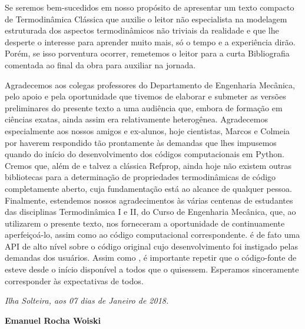     Se seremos bem-sucedidos em nosso propósito de apresentar um texto compacto
    de Termodinâmica Clássica que auxilie o leitor não especialista na
    modelagem estruturada dos aspectos termodinâmicos não triviais da realidade
    e que lhe desperte o interesse para aprender muito mais, só o tempo e a
    experiência dirão. Porém, se isso porventura ocorrer, remetemos o leitor
    para a curta Bibliografia comentada ao final da obra para auxiliar na
    jornada.

    Agradecemos aos colegas professores do Departamento de Engenharia Mecânica,
    pelo apoio e pela oportunidade que tivemos de elaborar e submeter as
    versões preliminares do presente texto a uma audiência que, embora de
    formação em ciências exatas, ainda assim era relativamente heterogênea.
    Agradecemos especialmente aos nossos amigos e ex-alunos, hoje cientistas,
    Marcos e Colmeia por haverem respondido tão prontamente às demandas que
    lhes impusemos quando do início do desenvolvimento dos códigos
    computacionais em Python. Cremos que, além de
     e talvez a clássica Refprop, ainda hoje
    não existem outras bibliotecas para a determinação de propriedades
    termodinâmicas de código completamente aberto, cuja fundamentação está ao
    alcance de qualquer pessoa. Finalmente, estendemos nossos agradecimentos às
    várias centenas de estudantes das disciplinas Termodinâmica I e II, do
    Curso de Engenharia Mecânica, que, ao utilizarem o presente texto, nos
    forneceram a oportunidade de continuamente aperfeiçoá-lo, assim como ao
    código computacional correspondente.   é de fato uma
    API de alto nível sobre o código original 
    cujo desenvolvimento foi instigado pelas demandas dos usuários.  Assim como
    , é importante repetir que o código-fonte de
     esteve desde o início disponível a todos
    que o quisessem. Esperamos sinceramente corresponder às expectativas de
    todos.

    \begin{center}
        \textit{Ilha Solteira, aos 07 dias de Janeiro de 2018.}

        \textbf{Emanuel Rocha Woiski}
    \end{center}
